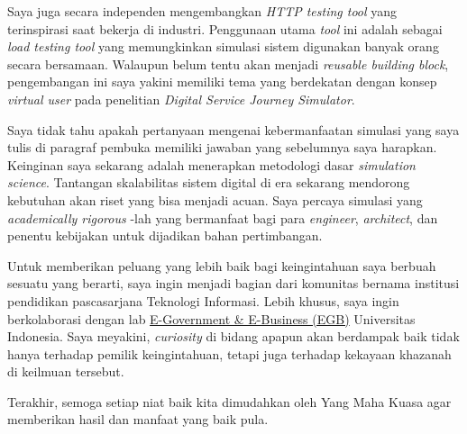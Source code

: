 \documentclass[12pt,a4paper]{article}
\begin{document}
Saya juga secara independen mengembangkan \emph{HTTP testing tool} yang terinspirasi saat bekerja di industri.
Penggunaan utama \emph{tool} ini adalah sebagai \emph{load testing tool} yang 
memungkinkan simulasi sistem digunakan banyak orang secara bersamaan.
Walaupun belum tentu akan menjadi \emph{reusable building block}, pengembangan ini saya yakini memiliki tema yang berdekatan
dengan konsep \emph{virtual user} pada penelitian \emph{Digital Service Journey Simulator}.


\vspace{\baselineskip}

Saya tidak tahu apakah pertanyaan mengenai kebermanfaatan simulasi yang saya tulis di paragraf pembuka memiliki jawaban yang sebelumnya saya harapkan.
Keinginan saya sekarang adalah menerapkan metodologi dasar \emph{simulation science}.
Tantangan skalabilitas sistem digital di era sekarang mendorong kebutuhan akan riset yang bisa menjadi acuan.
Saya percaya simulasi yang \emph{academically rigorous} -lah yang bermanfaat bagi para \emph{engineer}, \emph{architect},
dan penentu kebijakan untuk dijadikan bahan pertimbangan.

Untuk memberikan peluang yang lebih baik bagi keingintahuan saya berbuah sesuatu yang berarti,
saya ingin menjadi bagian dari komunitas bernama institusi pendidikan pascasarjana Teknologi Informasi.
Lebih khusus, saya ingin berkolaborasi dengan lab 
\href{https://scholar.ui.ac.id/en/organisations/e-government-e-business-egb/}{E-Government \& E-Business (EGB)} Universitas Indonesia.
Saya meyakini, \emph{curiosity} di bidang apapun akan berdampak baik tidak hanya terhadap pemilik keingintahuan, tetapi juga
terhadap kekayaan khazanah di keilmuan tersebut.

Terakhir, semoga setiap niat baik kita dimudahkan oleh Yang Maha Kuasa agar memberikan hasil dan manfaat yang baik pula.
\end{document}
